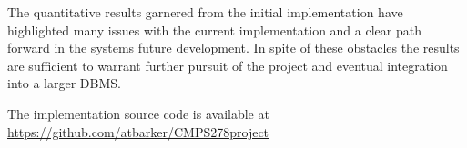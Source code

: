 \documentclass{article}
\begin{document}
The quantitative results garnered from the initial implementation have highlighted many issues with the current implementation and a clear path forward in the systems future development. In spite of these obstacles the results are sufficient to warrant further pursuit of the project and eventual integration into a larger DBMS.

The implementation source code is available at \url{https://github.com/atbarker/CMPS278project}



\end{document}
